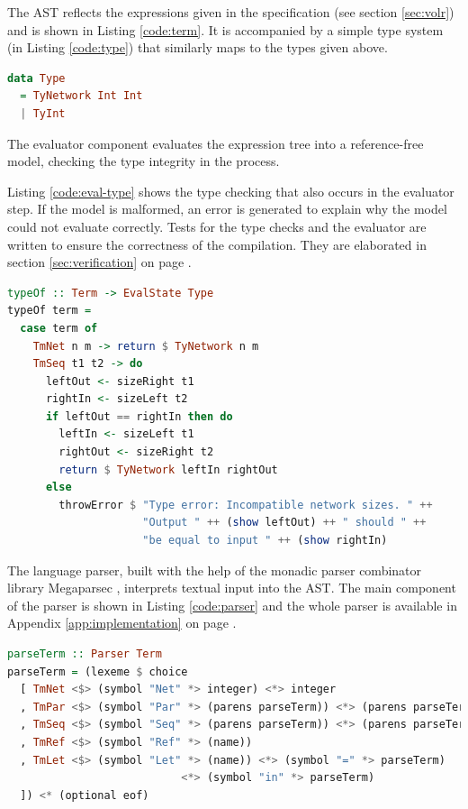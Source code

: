 The AST reflects the expressions given in the 
specification (see section \ref{sec:volr}) and is
shown in Listing \ref{code:term}.
It is accompanied by a simple type system (in Listing \ref{code:type})
that similarly maps to the types given above.

\begin{lstlisting}[language=haskell,label={code:type},caption={Volr type system
in Haskell}]
data Type 
  = TyNetwork Int Int
  | TyInt
\end{lstlisting}

The evaluator component evaluates the expression tree into
a reference-free model, checking the type integrity in the
process.

Listing \ref{code:eval-type} shows the type checking
that also occurs in the evaluator step. 
If the model is malformed, an error is generated to explain why the
model could not evaluate correctly.
Tests for the type checks and the evaluator are written to ensure the
correctness of the compilation.
They are elaborated in section \ref{sec:verification} on page
\pageref{sec:verification}.

\begin{lstlisting}[language=Haskell,caption={Part of the type checking code in
Haskell.},label={code:eval-type}]
typeOf :: Term -> EvalState Type
typeOf term = 
  case term of
    TmNet n m -> return $ TyNetwork n m
    TmSeq t1 t2 -> do
      leftOut <- sizeRight t1
      rightIn <- sizeLeft t2
      if leftOut == rightIn then do
        leftIn <- sizeLeft t1
        rightOut <- sizeRight t2
        return $ TyNetwork leftIn rightOut
      else
        throwError $ "Type error: Incompatible network sizes. " ++
                     "Output " ++ (show leftOut) ++ " should " ++
                     "be equal to input " ++ (show rightIn)
\end{lstlisting}

The language parser, built with the help of the monadic parser combinator library Megaparsec
\cite{megaparsec}, interprets textual input into the AST. 
The main component of the parser is shown in Listing \ref{code:parser}
and the whole parser is available in Appendix \ref{app:implementation} on page
\pageref{app:implementation_parser}.

\begin{lstlisting}[language=Haskell,name=The main component of the text parser
for Volr.,label={code:parser}]
parseTerm :: Parser Term
parseTerm = (lexeme $ choice
  [ TmNet <$> (symbol "Net" *> integer) <*> integer
  , TmPar <$> (symbol "Par" *> (parens parseTerm)) <*> (parens parseTerm)
  , TmSeq <$> (symbol "Seq" *> (parens parseTerm)) <*> (parens parseTerm)
  , TmRef <$> (symbol "Ref" *> (name))
  , TmLet <$> (symbol "Let" *> (name)) <*> (symbol "=" *> parseTerm)
                           <*> (symbol "in" *> parseTerm)
  ]) <* (optional eof)
\end{lstlisting}

